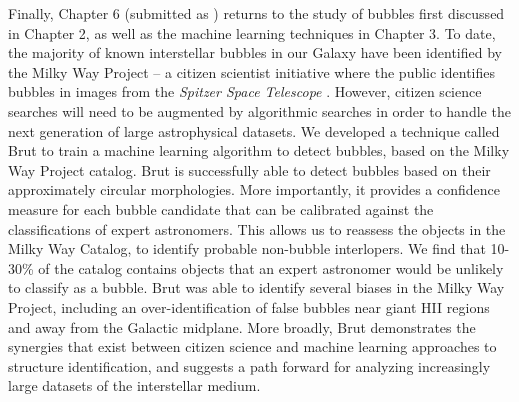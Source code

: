Finally, Chapter 6 (submitted as \citealt{Beaumont13b}) returns to the study of bubbles first discussed in Chapter 2, as well as the machine learning techniques in Chapter 3. To date, the majority of known interstellar bubbles in our Galaxy have been identified by the Milky Way Project -- a citizen scientist initiative where the public identifies bubbles in images from the \textit{Spitzer Space Telescope} \citep{Simpson12}. However, citizen science searches will need to be augmented by algorithmic searches in order to handle the next generation of large astrophysical datasets. We developed a technique called Brut to train a machine learning algorithm to detect bubbles, based on the Milky Way Project catalog. Brut is successfully able to detect bubbles based on their approximately circular morphologies. More importantly, it provides a confidence measure for each bubble candidate that can be calibrated against the classifications of expert astronomers. This allows us to reassess the objects in the Milky Way Catalog, to identify probable non-bubble interlopers. We find that 10-30\% of the catalog contains objects that an expert astronomer would be unlikely to classify as a bubble. Brut was able to identify several biases in the Milky Way Project, including an over-identification of false bubbles near giant HII regions and away from the Galactic midplane. More broadly, Brut demonstrates the synergies that exist between citizen science and machine learning approaches to structure identification, and suggests a path forward for analyzing increasingly large datasets of the interstellar medium.



